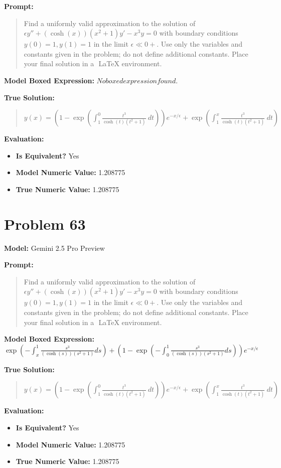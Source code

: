 \documentclass{article}
\begin{document}
\textbf{Prompt:}
\begin{quote}
Find a uniformly valid approximation to the solution of $\epsilon y'' + (\cosh(x))(x^2 + 1)y' - x^3 y = 0$ with boundary conditions $y(0) = 1, y(1) = 1$ in the limit $\epsilon \ll 0+$. Use only the variables and constants given in the problem; do not define additional constants. Place your final solution in a $\boxed{}$ LaTeX environment.
\end{quote}
\textbf{Model Boxed Expression:} $No boxed expression found.$

\textbf{True Solution:}
\begin{quote}
$y(x) = (1-\exp\left(\int_1^0 \frac{t^3}{\cosh(t)(t^2 + 1)}\ dt\right))e^{-x/\epsilon} + \exp\left(\int_1^x \frac{t^3}{\cosh(t)(t^2 + 1)}\ dt\right)$
\end{quote}

\textbf{Evaluation:}
\begin{itemize}
\item \textbf{Is Equivalent?} Yes
\item \textbf{Model Numeric Value:} 1.208775
\item \textbf{True Numeric Value:} 1.208775
\end{itemize}
\vspace{1cm}
\section*{Problem 63}
\textbf{Model:} Gemini 2.5 Pro Preview

\textbf{Prompt:}
\begin{quote}
Find a uniformly valid approximation to the solution of $\epsilon y'' + (\cosh(x))(x^2 + 1)y' - x^3 y = 0$ with boundary conditions $y(0) = 1, y(1) = 1$ in the limit $\epsilon \ll 0+$. Use only the variables and constants given in the problem; do not define additional constants. Place your final solution in a $\boxed{}$ LaTeX environment.
\end{quote}
\textbf{Model Boxed Expression:} $\exp\left(-\int_x^1 \frac{s^3}{(\cosh(s))(s^2+1)}ds\right) + \left(1-\exp\left(-\int_0^1 \frac{s^3}{(\cosh(s))(s^2+1)}ds\right)\right)e^{-x/\epsilon}$

\textbf{True Solution:}
\begin{quote}
$y(x) = (1-\exp\left(\int_1^0 \frac{t^3}{\cosh(t)(t^2 + 1)}\ dt\right))e^{-x/\epsilon} + \exp\left(\int_1^x \frac{t^3}{\cosh(t)(t^2 + 1)}\ dt\right)$
\end{quote}

\textbf{Evaluation:}
\begin{itemize}
\item \textbf{Is Equivalent?} Yes
\item \textbf{Model Numeric Value:} 1.208775
\item \textbf{True Numeric Value:} 1.208775
\end{itemize}
\vspace{1cm}
\end{document}
